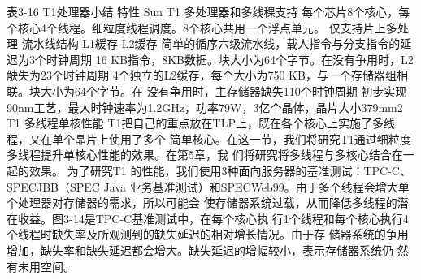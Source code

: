 表3-16 T1处理器小结
特性
Sun T1
多处理器和多线稞支持
每个芯片8个核心，每个核心4个线程。细粒度线程调度。8个核心共用一个浮点单元。
仅支持片上多处理
流水线结构
L1緩存
L2缓存
简单的循序六级流水线，载人指令与分支指令的延迟为3个时钟周期
16 KB指令，8KB数据。块大小为64个字节。在没有争用时，L2觖失为23个时钟周期
4个独立的L2缓存，每个大小为750 KB，与一个存储器组相联。块大小为64个字节。在
没有争用时，主存储器缺失110个时钟周期
初步实现
90nm工艺，最大时钟速率为1.2GHz，功率79W，3亿个晶体，晶片大小379mm2
T1 多线程单核性能
T1把自己的重点放在TLP上，既在各个核心上实施了多线程，又在单个晶片上使用了多个
简单核心。在这一节，我们将研究T1通过细粒度多线程提升单核心性能的效果。在第5章，我
们将研究将多线程与多核心结合在一起的效果。
为了研究T1 的性能，我们使用3种面向服务器的基准测试：TPC-C、SPECJBB（SPEC Java
业务基准测试）和SPECWeb99。由于多个线程会增大单个处理器对存储器的需求，所以可能会
使存储器系统过载，从而降低多线程的潜在收益。图3-14是TPC-C基准测试中，在每个核心执
行1个线程和每个核心执行4个线程时缺失率及所观测到的缺失延迟的相对增长情况。由于存
储器系统的争用增加，缺失率和缺失延迟都会增大。缺失延迟的增幅较小，表示存储器系统仍
然有未用空间。


